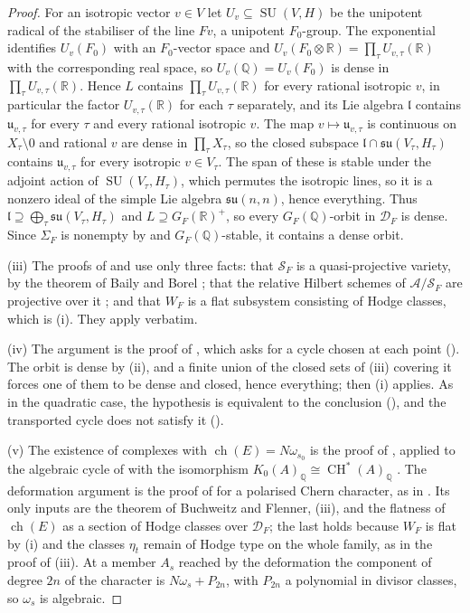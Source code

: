 \documentclass[11pt,reqno]{amsart}
\theoremstyle{plain}
\theoremstyle{definition}
\theoremstyle{remark}
\newcommand{\QQ}{\mathbb{Q}}
\newcommand{\RR}{\mathbb{R}}
\newcommand{\cA}{\mathcal{A}}
\newcommand{\cD}{\mathcal{D}}
\newcommand{\cS}{\mathcal{S}}
\DeclareMathOperator{\CH}{CH}
\DeclareMathOperator{\ch}{ch}
\DeclareMathOperator{\SU}{SU}
\begin{document}
\begin{proof}
For an isotropic vector $v\in V$ let $U_{v}\subseteq\SU(V,H)$ be the
unipotent radical of the stabiliser of the line $Fv$, a unipotent
$F_{0}$-group. The exponential identifies $U_{v}(F_{0})$ with an
$F_{0}$-vector space and $U_{v}(F_{0}\otimes\RR)=\prod_{\tau}U_{v,\tau}(\RR)$
with the corresponding real space, so $U_{v}(\QQ)=U_{v}(F_{0})$ is dense in
$\prod_{\tau}U_{v,\tau}(\RR)$. Hence $L$ contains
$\prod_{\tau}U_{v,\tau}(\RR)$ for every rational isotropic $v$, in particular
the factor $U_{v,\tau}(\RR)$ for each $\tau$ separately, and its Lie algebra
$\mathfrak{l}$ contains $\mathfrak{u}_{v,\tau}$ for every $\tau$ and every
rational isotropic $v$. The map $v\mapsto\mathfrak{u}_{v,\tau}$ is continuous
on $X_{\tau}\setminus0$ and rational $v$ are dense in
$\prod_{\tau}X_{\tau}$, so the closed subspace
$\mathfrak{l}\cap\mathfrak{su}(V_{\tau},H_{\tau})$ contains
$\mathfrak{u}_{v,\tau}$ for every isotropic $v\in V_{\tau}$. The span of these
is stable under the adjoint action of $\SU(V_{\tau},H_{\tau})$, which permutes
the isotropic lines, so it is a nonzero ideal of the simple Lie algebra
$\mathfrak{su}(n,n)$, hence everything. Thus
$\mathfrak{l}\supseteq\bigoplus_{\tau}\mathfrak{su}(V_{\tau},H_{\tau})$ and
$L\supseteq G_{F}(\RR)^{+}$, so every $G_{F}(\QQ)$-orbit in $\cD_{F}$ is
dense. Since $\Sigma_{F}$ is nonempty by  and
$G_{F}(\QQ)$-stable, it contains a dense orbit.

(iii) The proofs of  and  use
only three facts: that $\cS_{F}$ is a quasi-projective variety, by the
theorem of Baily and Borel \cite{BB66}; that the relative Hilbert schemes of
$\cA/\cS_{F}$ are projective over it \cite{Gro61}; and that $W_{F}$ is a flat
subsystem consisting of Hodge classes, which is (i). They
apply verbatim.

(iv) The argument is the proof of , which asks for a
cycle chosen at each point (). The orbit is dense by
(ii), and a finite union of the closed sets of (iii) covering it forces one of
them to be dense and closed, hence everything; then (i) applies. As in the
quadratic case, the hypothesis is equivalent to the conclusion
(), and the transported cycle does not satisfy it
().

(v) The existence of complexes with $\ch(E)=N\omega_{s_{0}}$ is the proof of
\cite[Proposition~2.1]{paperII}, applied to the algebraic cycle of 
with the isomorphism $K_{0}(A)_{\QQ}\cong\CH^{*}(A)_{\QQ}$ \cite{Ful98}. The
deformation argument is the proof of \cite[Theorem~2.3]{paperII} for a
polarised Chern character, as in \cite[Remark~3.6]{paperII}. Its only inputs are
the theorem of Buchweitz and Flenner, (iii), and the flatness of $\ch(E)$ as
a section of Hodge classes over $\cD_{F}$; the last holds because $W_{F}$ is
flat by (i) and the classes $\eta_{t}$ remain of Hodge type
on the whole family, as in the proof of (iii). At a member
$A_{s}$ reached by the deformation the component of degree $2n$ of the
character is $N\omega_{s}+P_{2n}$, with $P_{2n}$ a polynomial in divisor
classes, so $\omega_{s}$ is algebraic.
\end{proof}
\end{document}

